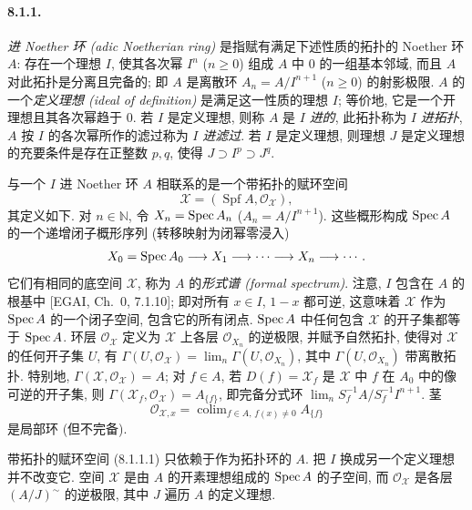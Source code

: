 \paragraph{8.1.1.}
\emph{进 Noether 环 (adic Noetherian ring)} 是指赋有满足下述性质的拓扑的 Noether 环 $A$: 存在一个理想 $I$, 使其各次幂 $I^n$ ($n\geq0$) 组成 $A$ 中 $0$ 的一组基本邻域, 而且 $A$ 对此拓扑是分离且完备的; 即 $A$ 是离散环 $A_n=A/I^{n+1}$ ($n\geq0$) 的射影极限. $A$ 的一个\emph{定义理想 (ideal of definition)} 是满足这一性质的理想 $I$; 等价地, 它是一个开理想且其各次幂趋于 $0$. 若 $I$ 是定义理想, 则称 $A$ 是 $I$ \emph{进的}, 此拓扑称为 $I$ \emph{进拓扑}, $A$ 按 $I$ 的各次幂所作的滤过称为 $I$ \emph{进滤过}.
若 $I$ 是定义理想, 则理想 $J$ 是定义理想的充要条件是存在正整数 $p,q$, 使得 $J\supset I^p\supset J^q$.

与一个 $I$ 进 Noether 环 $A$ 相联系的是一个带拓扑的赋环空间
\begin{equation}\mathcal X=(\operatorname{Spf}A,\mathcal O_{\mathcal X}),\tag{8.1.1.1}\label{ch08:eq8111}\end{equation}
其定义如下. 对 $n\in\mathbb N$, 令 $X_n=\operatorname{Spec} A_n$ ($A_n=A/I^{n+1}$). 这些概形构成 $\operatorname{Spec} A$ 的一个递增闭子概形序列 (转移映射为闭幂零浸入)
\[
X_0=\operatorname{Spec} A_0\longrightarrow X_1\longrightarrow\cdots\longrightarrow X_n\longrightarrow\cdots.
\]
它们有相同的底空间 $\mathcal X$, 称为 $A$ 的\emph{形式谱 (formal spectrum)}. 注意, $I$ 包含在 $A$ 的根基中 [EGAI, Ch.~0, 7.1.10]; 即对所有 $x\in I$, $1-x$ 都可逆, 这意味着 $\mathcal X$ 作为 $\operatorname{Spec} A$ 的一个闭子空间, 包含它的所有闭点. $\operatorname{Spec} A$ 中任何包含 $\mathcal X$ 的开子集都等于 $\operatorname{Spec} A$. 环层 $\mathcal O_{\mathcal X}$ 定义为 $\mathcal X$ 上各层 $\mathcal O_{X_n}$ 的逆极限, 并赋予自然拓扑, 使得对 $\mathcal X$ 的任何开子集 $U$, 有 $\Gamma(U,\mathcal O_{\mathcal X})=\lim_n\Gamma(U,\mathcal O_{X_n})$, 其中 $\Gamma(U,\mathcal O_{X_n})$ 带离散拓扑. 特别地, $\Gamma(\mathcal X,\mathcal O_{\mathcal X})=A$; 对 $f\in A$, 若 $D(f)=\mathcal X_f$ 是 $\mathcal X$ 中 $f$ 在 $A_0$ 中的像可逆的开子集, 则 $\Gamma(\mathcal X_f,\mathcal O_{\mathcal X})=A_{\{f\}}$, 即完备分式环 $\lim_n S_f^{-1}A/S_f^{-1}I^{n+1}$. 茎
\[
\mathcal O_{\mathcal X,x}=\operatorname{colim}_{f\in A,\,f(x)\ne0}A_{\{f\}}
\]
是局部环 (但不完备).

带拓扑的赋环空间 (8.1.1.1) 只依赖于作为拓扑环的 $A$. 把 $I$ 换成另一个定义理想并不改变它. 空间 $\mathcal X$ 是由 $A$ 的开素理想组成的 $\operatorname{Spec} A$ 的子空间, 而 $\mathcal O_{\mathcal X}$ 是各层 $(A/J)^\sim$ 的逆极限, 其中 $J$ 遍历 $A$ 的定义理想.


